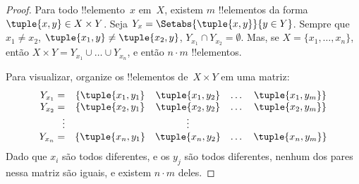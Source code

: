 \documentclass[../../../include/open-logic-section]{subfiles}
\begin{document}

\begin{proof}
Para todo !!{elemento}~$x$ em~$X$, existem $m$ !!{elemento}s da forma $\tuple{x, y} \in X \times Y$. Seja $Y_x = \Setabs{\tuple{x, y}}{y
  \in Y}$. Sempre que $x_1 \neq x_2$, $\tuple{x_1, y} \neq
\tuple{x_2, y}$, $Y_{x_1} \cap Y_{x_2} = \emptyset$. Mas, se $X = \{x_1,
\dots, x_n\}$, então $X \times Y = Y_{x_1} \cup \dots \cup Y_{x_n}$, e então $n\cdot m$ !!{elemento}s.

Para visualizar, organize os !!{elemento}s de~$X \times Y$ em uma matriz:
\[
\begin{array}{rcccc}
  Y_{x_1} = & \{\tuple{x_1, y_1} & \tuple{x_1, y_2} & \dots & \tuple{x_1, y_m}\}\\
  Y_{x_2} = & \{\tuple{x_2, y_1} & \tuple{x_2, y_2} & \dots & \tuple{x_2, y_m}\}\\
  \vdots & & \vdots\\
  Y_{x_n} = & \{\tuple{x_n, y_1} & \tuple{x_n, y_2} & \dots & \tuple{x_n, y_m}\}
\end{array}
\]
Dado que $x_i$ são todos diferentes, e os $y_j$ são todos diferentes,
nenhum dos pares nessa matriz são iguais, e existem $n\cdot m$
deles.
\end{proof}


\end{document}
